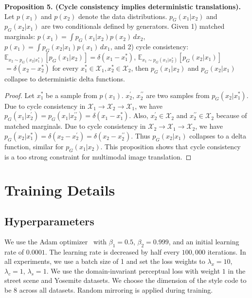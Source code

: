 \documentclass[runningheads]{llncs}
\begin{document}
\noindent \textbf{Proposition 5. (Cycle consistency implies deterministic translations).}
	Let $p(x_{1})$ and $p(x_{2})$ denote the data distributions. $p_{G}(x_{1}|x_{2})$ and $p_{G}(x_{2}|x_{1})$ are two conditionals defined by generators. Given 1) matched marginals: $p(x_{1})=\int p_{G}(x_{1}|x_{2})p(x_{2})\,dx_{2}$, $p(x_{1})=\int p_{G}(x_{2}|x_{1})p(x_{1})\,dx_{1}$, and 2) cycle consistency: $\mathbb{E}_{x_{2}\sim p_{G}(x_{2}|x^{*}_{1})}[p_{G}(x_{1}|x_{2})]=\delta(x_{1}-x^{*}_{1})$, $\mathbb{E}_{x_{1}\sim p_{G}(x_{1}|x^{*}_{2})}[p_{G}(x_{2}|x_{1})]$$=\delta(x_{2}-x^{*}_{2})$ for every $x^{*}_{1}\in\mathcal{X}_{1}, x^{*}_{2}\in\mathcal{X}_{2}$, then $p_{G}(x_{1}|x_{2})$ and $p_{G}(x_{2}|x_{1})$ collapse to deterministic delta functions.


\begin{proof}
		Let $x^{*}_{1}$ be a sample from $p(x_{1})$. $x^{\prime}_{2}$, $x^{\prime\prime}_{2}$ are two samples from $p_{G}(x_{2}|x^{*}_{1})$. Due to cycle consistency in $\mathcal{X}_{1}\rightarrow \mathcal{X}_{2}\rightarrow \mathcal{X}_{1}$, we have $p_{G}(x_{1}|x^{\prime}_{2})=p_{G}(x_{1}|x^{\prime\prime}_{2})=\delta(x_{1}-x^{*}_{1})$. Also, $x^{\prime}_{2}\in\mathcal{X}_{2}$ and $x^{\prime\prime}_{2}\in \mathcal{X}_{2}$ because of matched marginals. Due to cycle consistency in $\mathcal{X}_{2}\rightarrow \mathcal{X}_{1}\rightarrow \mathcal{X}_{2}$, we have $p_{G}(x_{2}|x^{*}_{1})=\delta(x_{2}-x^{\prime}_{2})=\delta(x_{2}-x^{\prime\prime}_{2})$. Thus $p_{G}(x_{2}|x_{1})$ collapses to a delta function, similar for $p_{G}(x_{1}|x_{2})$.		
		This proposition shows that cycle consistency~\cite{zhu2017unpaired} is a too strong constraint for multimodal image translation.
	\end{proof}
	
\section{Training Details}
	\label{app:hyperparameters}
	\subsection{Hyperparameters}
	We use the Adam optimizer~\cite{kingma2015adam} with $\beta_{1}=0.5$, $\beta_{2}=0.999$, and an initial learning rate of $0.0001$. The learning rate is decreased by half every $100,000$ iterations. In all experiments, we use a batch size of 1 and set the loss weights to $\lambda_{x}=10$, $\lambda_{c}=1$, $\lambda_{s}=1$. We use the domain-invariant perceptual loss with weight $1$ in the street scene and Yosemite datasets. We choose the dimension of the style code to be $8$ across all datasets. Random mirroring is applied during training.
\end{document}
